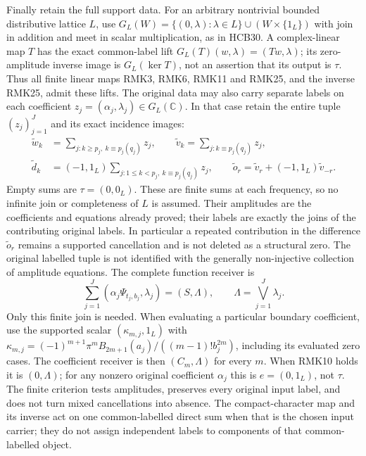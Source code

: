\documentclass[11pt]{article}
\begin{document}
Finally retain the full support data. For an arbitrary nontrivial
bounded distributive lattice $L$, use
$G_L(W)=\{(0,\lambda):\lambda\in L\}\cup(W\times\{1_L\})$
with join in addition and meet in scalar multiplication, as in
HCB30. A complex-linear map $T$ has the exact common-label lift
$G_L(T)(w,\lambda)=(Tw,\lambda)$; its zero-amplitude inverse image
is $G_L(\ker T)$, not an assertion that its output is $\tau$.
Thus all finite linear maps RMK3, RMK6, RMK11 and RMK25, and
the inverse RMK25, admit these lifts. The original data may also
carry separate labels on each coefficient
$z_j=(\alpha_j,\lambda_j)\in G_L(\mathbb C)$. In that case retain
the entire tuple $(z_j)_{j=1}^J$ and its exact incidence images:
\begin{equation}\tag{RMK30}
\begin{split}
 \widetilde w_k&=\sum_{j:k\geq p_j,\ k\equiv p_j(q_j)}z_j,\qquad
 \widetilde v_k=\sum_{j:k\equiv p_j(q_j)}z_j,\\
 \widetilde d_k&=(-1,1_L)
                  \sum_{j:1\leq k<p_j,\ k\equiv p_j(q_j)}z_j,\qquad
 \widetilde o_r=\widetilde v_r+(-1,1_L)\widetilde v_{-r}.
\end{split}
\end{equation}
Empty sums are $\tau=(0,0_L)$. These are finite sums at each
frequency, so no infinite join or completeness of $L$ is assumed.
Their amplitudes are the coefficients and equations already proved;
their labels are exactly the joins of the contributing original
labels. In particular a repeated contribution in the difference
$\widetilde o_r$ remains a supported cancellation and is not
deleted as a structural zero. The original labelled tuple is not
identified with the generally non-injective collection of amplitude
equations. The complete function receiver is
\begin{equation}\tag{RMK31}
 \sum_{j=1}^J(\alpha_j\Psi_{t_j,b_j},\lambda_j)
      =(S,\Lambda),\qquad \Lambda=\bigvee_{j=1}^J\lambda_j.
\end{equation}
Only this finite join is needed. When evaluating a particular
boundary coefficient, use the supported scalar
$(\kappa_{m,j},1_L)$ with
$\kappa_{m,j}=(-1)^{m+1}\pi^mB_{2m+1}(a_j)/((m-1)!b_j^{2m})$,
including its evaluated zero cases. The coefficient receiver is
then $(C_m,\Lambda)$ for every $m$. When RMK10 holds it is
$(0,\Lambda)$; for any nonzero original coefficient $\alpha_j$
this is $e=(0,1_L)$, not $\tau$. The finite criterion tests
amplitudes, preserves every original input label, and does not
turn mixed cancellations into absence. The compact-character map
and its inverse act on one common-labelled direct sum when that
is the chosen input carrier; they do not assign independent
labels to components of that common-labelled object.
\end{document}
